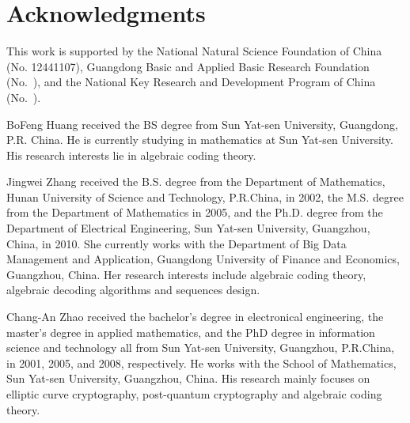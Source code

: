 \documentclass[journal,12pt,onecolumn]{IEEEtran}
\begin{document}
\section*{Acknowledgments}
This work is supported by the National Natural Science Foundation of China (No. 12441107), Guangdong Basic and Applied Basic Research Foundation (No.~),  and  the National Key Research and Development Program of
China (No.~).






\begin{IEEEbiographynophoto}{BoFeng Huang}
received the BS degree from Sun Yat-sen University, Guangdong, P.R. China. He is currently studying in mathematics at Sun Yat-sen University. His research interests lie in algebraic coding theory.
\end{IEEEbiographynophoto}

\begin{IEEEbiographynophoto}{Jingwei Zhang}
 received the B.S. degree from the Department of Mathematics, Hunan University of Science and Technology, P.R.China, in 2002, the M.S. degree from the Department of Mathematics in 2005, and the Ph.D. degree from the Department of Electrical Engineering, Sun Yat-sen University, Guangzhou, China, in 2010. She currently works with the Department of Big Data Management and Application, Guangdong University of Finance and Economics, Guangzhou, China. Her research interests include algebraic coding theory, algebraic decoding algorithms and sequences design.\end{IEEEbiographynophoto}




\begin{IEEEbiographynophoto}{Chang-An Zhao}
received the bachelor’s degree in electronical engineering, the master’s degree in applied mathematics, and the PhD degree in information science and technology all from Sun Yat-sen University, Guangzhou, P.R.China, in 2001, 2005, and 2008, respectively. He works with the School of Mathematics, Sun Yat-sen University, Guangzhou, China. His research mainly focuses on elliptic curve cryptography, post-quantum cryptography and algebraic coding theory.
\end{IEEEbiographynophoto}
\end{document}
